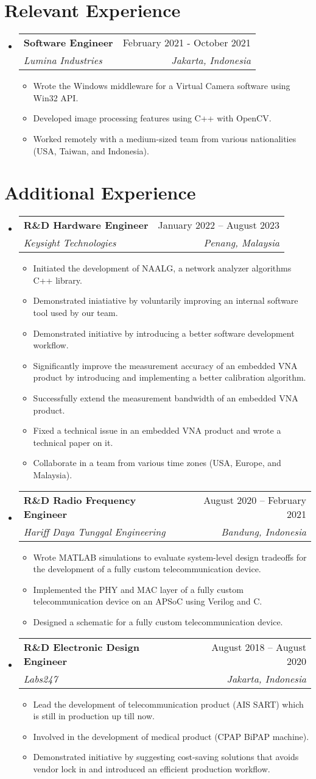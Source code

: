 \documentclass[letterpaper,11pt]{article}
\makeatletter
\newcommand{\resumeItem}[1]{
  \item\small{
    {#1 \vspace{-2pt}}
  }
}
\newcommand{\resumeSubheading}[4]{
  \vspace{-2pt}\item
    \begin{tabular*}{0.97\textwidth}[t]{l@{\extracolsep{\fill}}r}
      \textbf{#1} & #2 \\
      \textit{\small#3} & \textit{\small #4} \\
    \end{tabular*}\vspace{-7pt}
}
\newcommand{\resumeSubHeadingListStart}{\begin{itemize}[leftmargin=0.15in, label={}]}
\newcommand{\resumeSubHeadingListEnd}{\end{itemize}}
\newcommand{\resumeItemListStart}{\begin{itemize}}
\newcommand{\resumeItemListEnd}{\end{itemize}\vspace{-5pt}}
\makeatother
\begin{document}
\section{Relevant Experience}
\resumeSubHeadingListStart
\resumeSubheading
  {Software Engineer}{February 2021 - October 2021}
  {Lumina Industries}{Jakarta, Indonesia}
\resumeItemListStart
\resumeItem{Wrote the Windows middleware for a Virtual Camera software using
Win32 API.}
\resumeItem{Developed image processing features using C++ with OpenCV.}
\resumeItem{Worked remotely with a medium-sized team from various nationalities
(USA, Taiwan, and Indonesia).}
\resumeItemListEnd
\resumeSubHeadingListEnd

\section{Additional Experience}
\resumeSubHeadingListStart
\resumeSubheading
  {R\&D Hardware Engineer}{January 2022 -- August 2023}
  {Keysight Technologies}{Penang, Malaysia}
\resumeItemListStart
\resumeItem{Initiated the development of NAALG, a network analyzer algorithms
C++ library.}
\resumeItem{Demonstrated iniatiative by voluntarily improving an internal
software tool used by our team.}
\resumeItem{Demonstrated initiative by introducing a better software
development workflow.}
\resumeItem{Significantly improve the measurement accuracy of an embedded VNA
product by introducing and implementing a better calibration algorithm.}
\resumeItem{Successfully extend the measurement bandwidth of an embedded VNA
product.}
\resumeItem{Fixed a technical issue in an embedded VNA product and wrote a
technical paper on it.}
\resumeItem{Collaborate in a team from various time zones (USA, Europe, and
Malaysia).}
\resumeItemListEnd

\resumeSubheading
  {R\&D Radio Frequency Engineer}{August 2020 -- February 2021}
  {Hariff Daya Tunggal Engineering}{Bandung, Indonesia}
\resumeItemListStart
\resumeItem{Wrote MATLAB simulations to evaluate system-level design tradeoffs
for the development of a fully custom telecommunication device.}
\resumeItem{Implemented the PHY and MAC layer of a fully custom telecommunication
device on an APSoC using Verilog and C.}
\resumeItem{Designed a schematic for a fully custom telecommunication device.}
\resumeItemListEnd

\resumeSubheading
  {R\&D Electronic Design Engineer}{August 2018 -- August 2020}
  {Labs247}{Jakarta, Indonesia}
\resumeItemListStart
\resumeItem{Lead the development of telecommunication product (AIS SART) which
is still in production up till now.}
\resumeItem{Involved in the development of medical product (CPAP BiPAP
machine).}
\resumeItem{Demonstrated initiative by suggesting cost-saving solutions that
avoids vendor lock in and introduced an efficient production workflow.}
\resumeItemListEnd
\resumeSubHeadingListEnd

\end{document}
